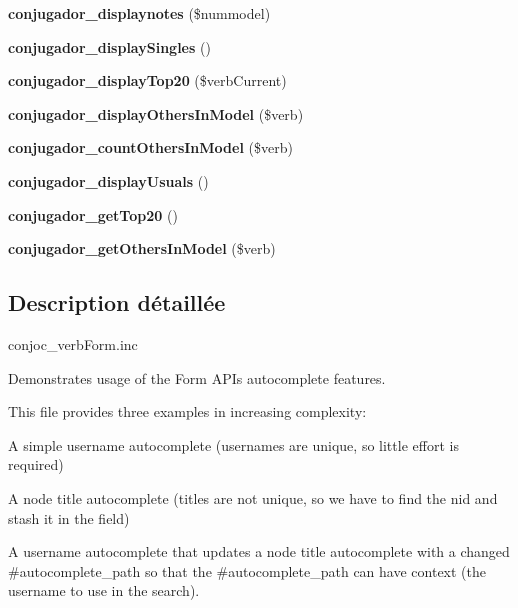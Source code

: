 \begin{DoxyCompactItemize}
\item 
\hypertarget{conjoc__webForm_8inc_a16562f736e2ff741407adb1ceb3c9170}{}\label{conjoc__webForm_8inc_a16562f736e2ff741407adb1ceb3c9170} 
{\bfseries conjugador\+\_\+displaynotes} (\$nummodel)
\item 
\hypertarget{conjoc__webForm_8inc_ac41ee7cf6ccd6dd46de8112c7c315cfe}{}\label{conjoc__webForm_8inc_ac41ee7cf6ccd6dd46de8112c7c315cfe} 
{\bfseries conjugador\+\_\+display\+Singles} ()
\item 
\hypertarget{conjoc__webForm_8inc_adfb69460570fdffecec436447f5ed729}{}\label{conjoc__webForm_8inc_adfb69460570fdffecec436447f5ed729} 
{\bfseries conjugador\+\_\+display\+Top20} (\$verb\+Current)
\item 
\hypertarget{conjoc__webForm_8inc_a64885b968e081840d6a10adc2a38db9e}{}\label{conjoc__webForm_8inc_a64885b968e081840d6a10adc2a38db9e} 
{\bfseries conjugador\+\_\+display\+Others\+In\+Model} (\$verb)
\item 
\hypertarget{conjoc__webForm_8inc_ac96a30f96cb3957ed4ac47c4eb40df10}{}\label{conjoc__webForm_8inc_ac96a30f96cb3957ed4ac47c4eb40df10} 
{\bfseries conjugador\+\_\+count\+Others\+In\+Model} (\$verb)
\item 
\hypertarget{conjoc__webForm_8inc_a1bfbce593ac5c763b1542fa713249aa3}{}\label{conjoc__webForm_8inc_a1bfbce593ac5c763b1542fa713249aa3} 
{\bfseries conjugador\+\_\+display\+Usuals} ()
\item 
\hypertarget{conjoc__webForm_8inc_a9ab9dfc2c3015a0855c27f37812bb897}{}\label{conjoc__webForm_8inc_a9ab9dfc2c3015a0855c27f37812bb897} 
{\bfseries conjugador\+\_\+get\+Top20} ()
\item 
\hypertarget{conjoc__webForm_8inc_a90ac7751a59eefed3b3576f1cedb016f}{}\label{conjoc__webForm_8inc_a90ac7751a59eefed3b3576f1cedb016f} 
{\bfseries conjugador\+\_\+get\+Others\+In\+Model} (\$verb)
\end{DoxyCompactItemize}


\subsection{Description détaillée}
conjoc\+\_\+verb\+Form.\+inc

Demonstrates usage of the Form A\+PI\textquotesingle{}s autocomplete features.

This file provides three examples in increasing complexity\+:
\begin{DoxyItemize}
\item A simple username autocomplete (usernames are unique, so little effort is required)
\item A node title autocomplete (titles are not unique, so we have to find the nid and stash it in the field)
\item A username autocomplete that updates a node title autocomplete with a changed \#autocomplete\+\_\+path so that the \#autocomplete\+\_\+path can have context (the username to use in the search). 
\end{DoxyItemize}

